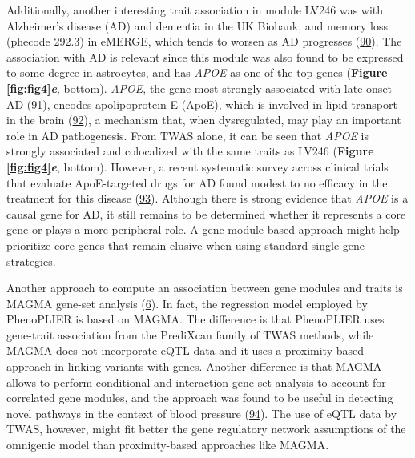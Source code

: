 Additionally, another interesting trait association in module LV246 was with Alzheimer's disease (AD) and dementia in the UK Biobank, and memory loss (phecode 292.3) in eMERGE, which tends to worsen as AD progresses (\protect\hyperlink{ref-Vxi0ejah}{90}).
The association with AD is relevant since this module was also found to be expressed to some degree in astrocytes, and has \emph{APOE} as one of the top genes (\textbf{Figure \ref{fig:fig4}\emph{e}}, bottom).
\emph{APOE}, the gene most strongly associated with late-onset AD (\protect\hyperlink{ref-hn3T60wf}{91}), encodes apolipoprotein E (ApoE), which is involved in lipid transport in the brain (\protect\hyperlink{ref-10ZgydXh1}{92}), a mechanism that, when dysregulated, may play an important role in AD pathogenesis.
From TWAS alone, it can be seen that \emph{APOE} is strongly associated and colocalized with the same traits as LV246 (\textbf{Figure \ref{fig:fig4}\emph{e}}, bottom).
However, a recent systematic survey across clinical trials that evaluate ApoE-targeted drugs for AD found modest to no efficacy in the treatment for this disease (\protect\hyperlink{ref-UadQwQsF}{93}).
Although there is strong evidence that \emph{APOE} is a causal gene for AD, it still remains to be determined whether it represents a core gene or plays a more peripheral role.
A gene module-based approach might help prioritize core genes that remain elusive when using standard single-gene strategies.

Another approach to compute an association between gene modules and traits is MAGMA gene-set analysis (\protect\hyperlink{ref-19XiXgYmd}{6}).
In fact, the regression model employed by PhenoPLIER is based on MAGMA.
The difference is that PhenoPLIER uses gene-trait association from the PrediXcan family of TWAS methods, while MAGMA does not incorporate eQTL data and it uses a proximity-based approach in linking variants with genes.
Another difference is that MAGMA allows to perform conditional and interaction gene-set analysis to account for correlated gene modules, and the approach was found to be useful in detecting novel pathways in the context of blood pressure (\protect\hyperlink{ref-Om8ZhS06}{94}).
The use of eQTL data by TWAS, however, might fit better the gene regulatory network assumptions of the omnigenic model than proximity-based approaches like MAGMA.

